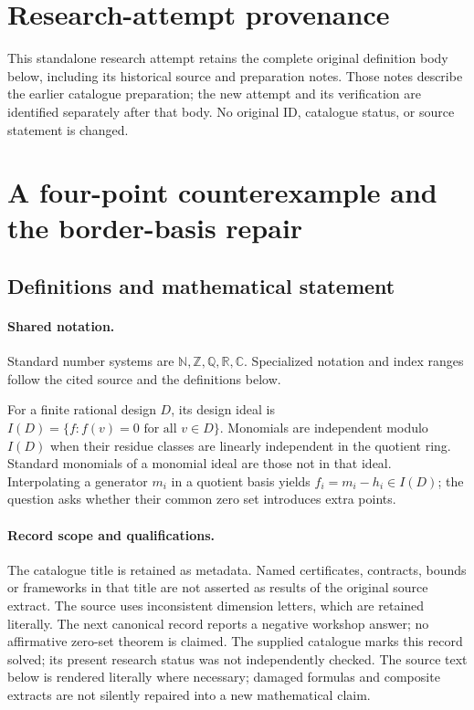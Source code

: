 \documentclass[11pt]{article}
\begin{document}
\section*{Research-attempt provenance}
This standalone research attempt retains the complete original definition body below,
including its historical source and preparation notes. Those notes describe the
earlier catalogue preparation; the new attempt and its verification are identified
separately after that body. No original ID, catalogue status, or source statement is changed.

\section{A four-point counterexample and the border-basis repair}\label{statement}

\subsection{Definitions and mathematical statement}

\paragraph{Shared notation.}Standard number systems are $\mathbb N,\mathbb Z,\mathbb Q,\mathbb R,\mathbb C$. Specialized notation and index ranges follow the cited source and the definitions below.


For a finite rational design $D$, its design ideal is $I(D)=\{f:f(v)=0\text{ for all }v\in D\}$. Monomials are independent modulo $I(D)$ when their residue classes are linearly independent in the quotient ring. Standard monomials of a monomial ideal are those not in that ideal. Interpolating a generator $m_i$ in a quotient basis yields $f_i=m_i-h_i\in I(D)$; the question asks whether their common zero set introduces extra points.
\paragraph{Record scope and qualifications.}
The catalogue title is retained as metadata. Named certificates, contracts, bounds or frameworks in that title are not asserted as results of the original source extract.
The source uses inconsistent dimension letters, which are retained literally. The next canonical record reports a negative workshop answer; no affirmative zero-set theorem is claimed. The supplied catalogue marks this record solved; its present research status was not independently checked.
The source text below is rendered literally where necessary; damaged formulas and composite extracts are not silently repaired into a new mathematical claim.
\end{document}
